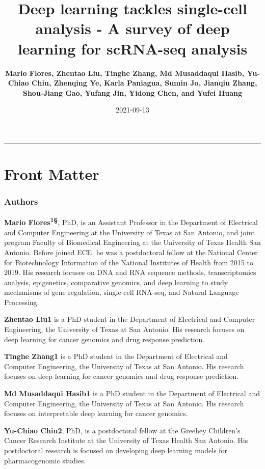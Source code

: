 \documentclass[
]{book}
\title{Deep learning tackles single-cell analysis - A survey of deep learning for scRNA-seq analysis}
\author{\textbf{Mario Flores, Zhentao Liu, Tinghe Zhang, Md Musaddaqui Hasib, Yu-Chiao Chiu, Zhenqing Ye, Karla Paniagua, Sumin Jo, Jianqiu Zhang, Shou-Jiang Gao, Yufang Jin, Yidong Chen, and Yufei Huang}}
\date{2021-09-13}
\begin{document}
\maketitle

{
\setcounter{tocdepth}{1}
\tableofcontents
}
\begin{center}\rule{0.5\linewidth}{0.5pt}\end{center}

\hypertarget{front-matter}{%
\chapter*{Front Matter}\label{front-matter}}

\hypertarget{authors}{%
\subsection*{Authors}\label{authors}}

\textbf{Mario Flores\textsuperscript{1§}}, PhD, is an Assistant Professor in the Department of Electrical and Computer Engineering at the University of Texas at San Antonio, and joint program Faculty of Biomedical Engineering at the University of Texas Health San Antonio. Before joined ECE, he was a postdoctoral fellow at the National Center for Biotechnology Information of the National Institutes of Health from 2015 to 2019. His research focuses on DNA and RNA sequence methods, transcriptomics analysis, epigenetics, comparative genomics, and deep learning to study mechanisms of gene regulation, single-cell RNA-seq, and Natural Language Processing.

\textbf{Zhentao Liu1} is a PhD student in the Department of Electrical and Computer Engineering, the University of Texas at San Antonio. His research focuses on deep learning for cancer genomics and drug response prediction.

\textbf{Tinghe Zhang1} is a PhD student in the Department of Electrical and Computer Engineering, the University of Texas at San Antonio. His research focuses on deep learning for cancer genomics and drug response prediction.

\textbf{Md Musaddaqui Hasib1} is a PhD student in the Department of Electrical and Computer Engineering, the University of Texas at San Antonio. His research focuses on interpretable deep learning for cancer genomics.

\textbf{Yu-Chiao Chiu2}, PhD, is a postdoctoral fellow at the Greehey Children's Cancer Research Institute at the University of Texas Health San Antonio. His postdoctoral research is focused on developing deep learning models for pharmacogenomic studies.
\end{document}

